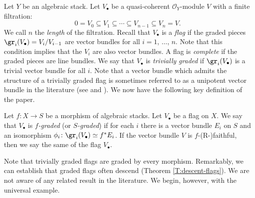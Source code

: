 \documentclass[reqno,a4paper]{amsart}
\numberwithin{Theorem}{section}
\newcommand{\Orb}{\mathcal{O}}
\theoremstyle{plain}
\theoremstyle{remark}
\begin{document}
Let $Y$ be an algebraic stack. Let
$V_\bullet$ be a quasi-coherent $\Orb_{Y}$-module $V$ with a finite filtration:
\[
  0 = V_{0} \subseteq V_1 \subseteq \cdots \subseteq V_{n-1} \subseteq V_n = V.
\]
We call $n$ the \emph{length} of the filtration. Recall that
$V_\bullet$ is a \emph{flag} if the graded pieces
$\gr_i(V_\bullet)=V_{i}/V_{i-1}$ are vector bundles for all $i=1$,
$\dots$, $n$. Note that this condition implies that the $V_i$ are
also vector bundles. A flag is \emph{complete} if the graded pieces
are line bundles. We say that $V_\bullet$ is \emph{trivially graded}
if $\gr_i(V_{\bullet})$ is a trivial vector bundle for all $i$. Note that a vector bundle which admits the structure of a trivially graded flag is sometimes referred to as a unipotent vector bundle in the literature (see \cite[Sec. 1]{MR318151} and \cite[Def. 4.5]{MR498572}). We now
have the following key definition of the paper.
\begin{definition}
  Let $f\colon X \to S$ be a morphism of algebraic stacks. Let
  $V_\bullet$ be a flag on $X$. We say that $V_\bullet$ is
  \emph{$f$-graded} (or \emph{$S$-graded}) if for each $i$ there is a
  vector bundle $E_i$ on $S$ and an isomorphism
  $\phi_i \colon \gr_i(V_\bullet)\simeq f^*E_i$. If the vector bundle $V$ is
   $f$-(R-)faithful, then we say the same of the flag $V_\bullet$.
\end{definition}
Note that trivially graded flags are graded by every morphism.
Remarkably, we can establish that graded flags often descend (Theorem
\ref{T:descent-flags}). We are not aware of any related result in the
literature. We begin, however, with the universal example.
\end{document}
